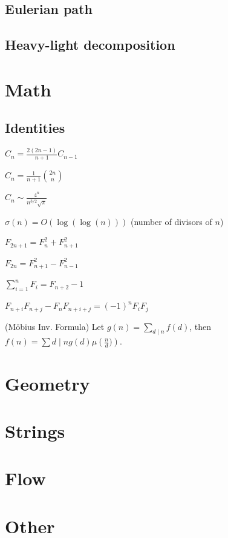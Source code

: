 \subsection{ Eulerian path }
\subsection{ Heavy-light decomposition }

\section{Math}
\subsection{Identities}
{
	$C_n = \frac{2(2n-1)}{n+1} C_{n-1}$

	$C_n = \frac{1}{n+1} \binom{2n}{n}$

	$C_n \sim \frac{4^n}{n^{3/2}\sqrt{\pi}}$

	$\sigma(n) = O(\log(\log(n)))$ (number of divisors of $n$)

	$F_{2n+1} = F_{n}^2 + F_{n+1}^2$

	$F_{2n} = F_{n+1}^2 - F_{n-1}^2$

	$\sum_{i=1}^n F_i = F_{n+2}-1$

	$F_{n+i}F_{n+j} - F_nF_{n+i+j} = (-1)^n F_iF_j$

	(Möbius Inv. Formula)
	Let $g(n) = \sum_{d\mid n} f(d)$, then $f(n)=\sum{d\mid n} g(d) \mu\left(\frac{n}{d})\right)$.
}

\section{Geometry}
\section{Strings}

\section{Flow}

\section{Other}


